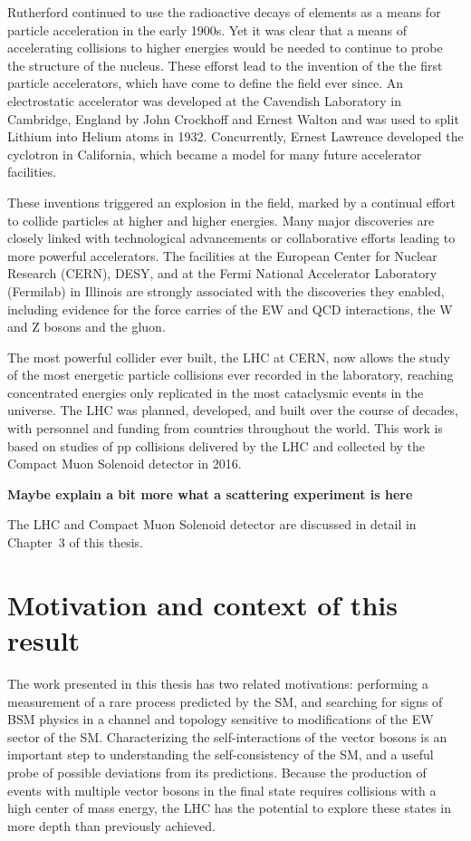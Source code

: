 Rutherford continued to use the radioactive decays of elements as a means
for particle acceleration in the early 1900s. Yet it was clear that
a means of accelerating collisions to higher energies would be needed
to continue to probe the structure of the nucleus.
These efforst lead to the invention of the 
the first particle accelerators, which have come to define the field ever since.
An electrostatic accelerator was developed at the Cavendish Laboratory
in Cambridge, England by John Crockhoff and Ernest Walton and
was used to split Lithium into Helium atoms in 1932.
Concurrently, Ernest Lawrence developed the cyclotron in California,
which became a model for many future accelerator facilities.

These inventions triggered an explosion in the field, marked by a continual 
effort to collide particles at higher and higher energies. Many major discoveries
are closely linked with technological advancements or collaborative
efforts leading to more powerful accelerators.
The facilities at the European Center for Nuclear
Research (CERN), DESY, and at the 
Fermi National Accelerator Laboratory (Fermilab) in Illinois
are strongly associated with the 
discoveries they enabled, including evidence for the force carries
of the EW and QCD interactions, the W and Z bosons and the gluon.

The most powerful collider ever built, the LHC at CERN,
now allows the study of the most energetic particle collisions ever
recorded in the laboratory, reaching concentrated energies only replicated
in the most cataclysmic events in the universe. The LHC
was planned, developed, and built over the course of decades, with
personnel and funding from countries throughout the world.
This work is based on studies of pp collisions delivered by the LHC 
and collected by the Compact Muon Solenoid detector in 2016.

\textbf{Maybe explain a bit more what a scattering experiment is here}

The LHC and Compact Muon Solenoid detector are discussed in detail 
in Chapter~3 of this thesis.

\section{Motivation and context of this result}
The work presented in this thesis
has two related motivations: performing a measurement of a rare
process predicted by the SM, and searching for signs of 
BSM physics in a channel and topology sensitive to modifications of
the EW sector of the SM.
Characterizing the self-interactions of the vector bosons is an important
step to understanding the self-consistency of the SM, and a useful probe
of possible deviations from its predictions. Because the production of events
with multiple vector bosons in the final state
requires collisions with a high center of mass energy, the LHC has
the potential to explore these states in more depth 
than previously achieved.


